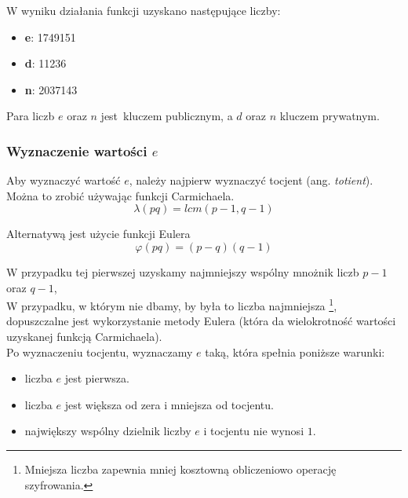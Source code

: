 \documentclass[12pt]{article}
\begin{document}
\newpage

W wyniku działania funkcji uzyskano następujące liczby:

\begin{itemize}
	\item \textbf{e}: 1749151
	\item \textbf{d}: 11236
	\item \textbf{n}: 2037143
\end{itemize}

Para liczb $e$ oraz $n$ jest kluczem publicznym, a $d$ oraz $n$ kluczem prywatnym.

\subsubsection{Wyznaczenie wartości $e$}

Aby wyznaczyć wartość $e$, należy najpierw wyznaczyć tocjent (ang. \textit{totient}).
\\

Można to zrobić używając funkcji Carmichaela.
\begin{equation}
	\lambda (pq) = lcm(p-1, q-1)
\end{equation}

Alternatywą jest użycie funkcji Eulera
\begin{equation}
	\varphi (pq) = (p-q)(q-1)
\end{equation}

W przypadku tej pierwszej uzyskamy
najmniejszy wspólny mnożnik liczb $p-1$ oraz $q-1$,
\\

W przypadku, w którym nie dbamy, by była to liczba najmniejsza
\footnote{Mniejsza liczba zapewnia mniej kosztowną obliczeniowo operację
szyfrowania.},
dopuszczalne jest wykorzystanie metody Eulera (która da wielokrotność
wartości uzyskanej funkcją Carmichaela).
\\

Po wyznaczeniu tocjentu, wyznaczamy $e$ taką, która spełnia poniższe warunki:

\begin{itemize}
	\item liczba $e$ jest pierwsza.
	\item liczba $e$ jest większa od zera i mniejsza od tocjentu.
	\item największy wspólny dzielnik liczby $e$ i tocjentu nie wynosi $1$.
\end{itemize}
\end{document}
